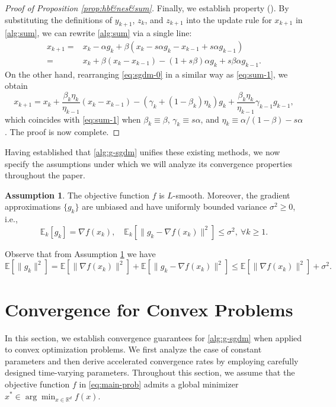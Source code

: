 \documentclass[10pt]{article}
\numberwithin{equation}{section}
\theoremstyle{definition}
\newtheorem{assumption}{Assumption}
\newcommand{\rbb}{\mathbb{R}}  %
\newcommand{\ebb}{\mathbb{E}}  %
\begin{document}
\begin{proof}[Proof of Proposition \ref{prop:hb&nes&sum}]
    Finally, we establish property (). By substituting the definitions of $y_{k+1}$, $z_k$, and $z_{k+1}$ into the update rule for $x_{k+1}$ in \eqref{alg:sum}, we can rewrite \eqref{alg:sum} via a single line:
    \begin{equation}\label{eq:sum-1}
    \begin{aligned}
        x_{k+1} = & x_k - \alpha g_k + \beta(x_k - s \alpha g_k - x_{k-1} + s \alpha g_{k-1})\\
        = & x_k + \beta (x_k - x_{k-1}) - (1+s\beta)\alpha g_k+ s\beta \alpha g_{k-1}.
    \end{aligned} 
    \end{equation}
    On the other hand, rearranging \eqref{eq:sgdm-0} in a similar way as \eqref{eq:sum-1}, we obtain
    \[
     x_{k+1} = x_k + \frac{\beta_k \eta_k}{\eta_{k-1}}(x_k - x_{k-1}) - (\gamma_k+(1-\beta_k)\eta_k) g_k + \frac{\beta_k \eta_k}{\eta_{k-1}}\gamma_{k-1} g_{k-1},
    \]
    which coincides with \eqref{eq:sum-1} when $\beta_k\equiv\beta$, $\gamma_k\equiv s\alpha$, and $\eta_k\equiv\alpha/(1-\beta)-s\alpha$. The proof is now complete.
\end{proof}

Having established that \eqref{alg:g-sgdm} unifies these existing methods, we now specify the assumptions under which we will analyze its convergence properties throughout the paper.
\begin{assumption}\label{ass:s-bv}
    The objective function $f$ is $L$-smooth. Moreover, the gradient approximations $\{g_k\}$ are unbiased and have uniformly bounded variance $\sigma^2\ge 0$, i.e.,
    \[
    \ebb_k[g_k]=\nabla f(x_k),\quad \ebb_k[\|g_k-\nabla f(x_k)\|^2]\leq \sigma^2,~\forall k\ge 1.
    \]
\end{assumption}
Observe that from Assumption \ref{ass:s-bv} we have
\begin{equation}\label{eq:g-bound}
    \ebb[\|g_k\|^2] = \ebb[\| \nabla f(x_k) \|^2]+\ebb[\|g_k-\nabla f(x_k)\|^2]\leq \ebb[\| \nabla f(x_k) \|^2]+\sigma^2.
\end{equation}

\section{Convergence for Convex Problems}
\label{sec:convergence-cvx}
In this section, we establish convergence guarantees for \eqref{alg:g-sgdm} when applied to convex optimization problems. We first analyze the case of constant parameters and then derive accelerated convergence rates by employing carefully designed time-varying parameters. Throughout this section, we assume that the objective function $f$ in \eqref{eq:main-prob} admits a global minimizer $x^*\in\arg\min_{x\in\rbb^d} f(x)$.
\end{document}
